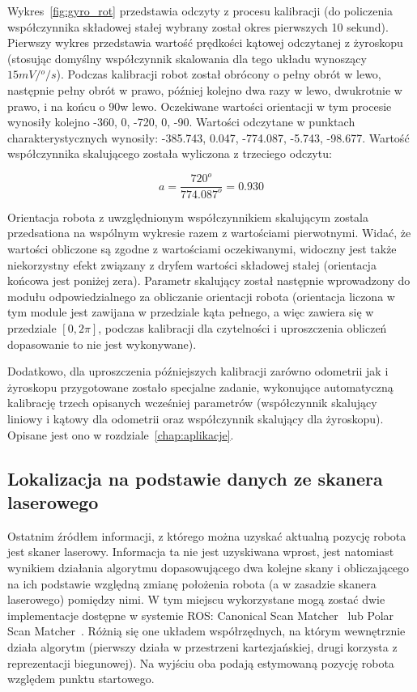 Wykres~\ref{fig:gyro_rot} przedstawia odczyty z procesu kalibracji (do
policzenia współczynnika składowej stałej wybrany został okres pierwszych 10
sekund). Pierwszy wykres przedstawia wartość prędkości kątowej odczytanej z
żyroskopu (stosując domyślny współczynnik skalowania dla tego układu wynoszący
$15mV/{}^o/s$). Podczas kalibracji robot został obrócony o pełny obrót w
lewo, następnie pełny obrót w prawo, później kolejno dwa razy w lewo, dwukrotnie
w prawo, i na końcu o 90\textdegree w lewo. Oczekiwane wartości orientacji w tym
procesie wynosiły kolejno -360\textdegree, 0\textdegree, -720\textdegree,
0\textdegree, -90\textdegree. Wartości odczytane w punktach charakterystycznych
wynosiły: -385.743\textdegree, 0.047\textdegree, -774.087\textdegree,
-5.743\textdegree, -98.677\textdegree. Wartość współczynnika skalującego została
wyliczona z trzeciego odczytu:

\[
a = \frac{720^o}{774.087^o} = 0.930
\]

Orientacja robota z uwzględnionym współczynnikiem skalującym zostala
przedsationa na wspólnym wykresie razem z wartościami pierwotnymi. Widać, że
wartości obliczone są zgodne z wartościami oczekiwanymi, widoczny jest także
niekorzystny efekt związany z dryfem wartości składowej stałej (orientacja
końcowa jest poniżej zera). Parametr skalujący został następnie wprowadzony
do modułu odpowiedzialnego za obliczanie orientacji robota (orientacja liczona
w tym module jest zawijana w przedziale kąta pełnego, a więc zawiera się w
przedziale $[0, 2\pi]$, podczas kalibracji dla czytelności i uproszczenia
obliczeń dopasowanie to nie jest wykonywane).

Dodatkowo, dla uproszczenia późniejszych kalibracji zarówno odometrii jak i
żyroskopu przygotowane zostało specjalne zadanie, wykonujące automatyczną
kalibrację trzech opisanych wcześniej parametrów (współczynnik skalujący
liniowy i kątowy dla odometrii oraz współczynnik skalujący dla żyroskopu).
Opisane jest ono w rozdziale~\ref{chap:aplikacje}.

\subsection{Lokalizacja na podstawie danych ze skanera laserowego}

Ostatnim źródłem informacji, z którego można uzyskać aktualną pozycję robota
jest skaner laserowy. Informacja ta nie jest uzyskiwana wprost, jest natomiast
wynikiem działania algorytmu dopasowującego dwa kolejne skany i obliczającego
na ich podstawie względną zmianę położenia robota (a w zasadzie skanera laserowego)
pomiędzy nimi. W tym miejscu wykorzystane mogą zostać dwie implementacje
dostępne w systemie ROS: Canonical Scan Matcher~\cite{4543181} lub Polar Scan
Matcher~\cite{1545181}. Różnią się one układem współrzędnych, na którym
wewnętrznie działa algorytm (pierwszy działa w przestrzeni kartezjańskiej,
drugi korzysta z reprezentacji biegunowej). Na wyjściu oba podają estymowaną
pozycję robota względem punktu startowego.

